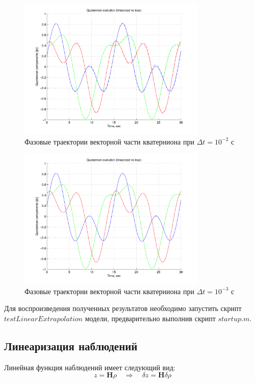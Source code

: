 \documentclass{article}
\begin{document}
\begin{figure}
\centering
\includegraphics[width=0.8\textwidth]{pic/extrapolation_001.pdf}
\caption{\label{fig:kalman_predictor_val_e-2}Фазовые траектории векторной
    части кватерниона при
$\Delta t = 10^{-2}$ с}
\end{figure}
\begin{figure}
\centering
\includegraphics[width=0.8\textwidth]{pic/extrapolation_0001.pdf}
\caption{\label{fig:kalman_predictor_val_e-3}Фазовые траектории векторной
    части кватерниона при
$\Delta t = 10^{-3}$ с}
\end{figure}
Для воспроизведения полученных результатов необходимо запустить скрипт
$testLinearExtrapolation$ модели, предварительно выполнив скрипт $startup.m$.
\subsection{Линеаризация наблюдений}
Линейная функция наблюдений имеет следующий вид:
$$
z = \mathbf{H}\rho \quad \Rightarrow \quad \delta z = \mathbf{H} \delta \rho
$$
\end{document}
